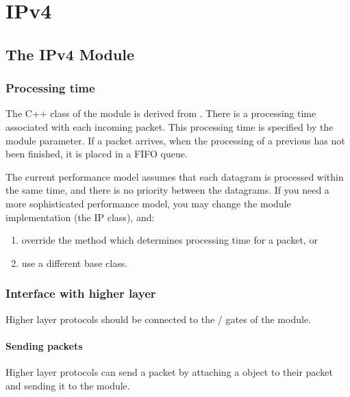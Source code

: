 \chapter{IPv4}
\label{cha:ipv4}

\section{The IPv4 Module}

\subsection{Processing time}

The C++ class of the  module is derived from .
There is a processing time associated with each incoming packet.
This processing time is specified by the  module parameter.
If a packet arrives, when the processing of a previous has not been
finished, it is placed in a FIFO queue.

The current performance model assumes that each datagram is processed
within the same time, and there is no priority between the datagrams.
If you need a more sophisticated performance model, you may change
the module implementation (the IP class), and:
\begin{enumerate}
  \item override the  method which determines processing
        time for a packet, or
  \item use a different base class.
\end{enumerate}

\subsection{Interface with higher layer}

Higher layer protocols should be connected to the /
gates of the  module.

\subsubsection*{Sending packets}

Higher layer protocols can send a packet by attaching a 
object to their packet and sending it to the  module.


